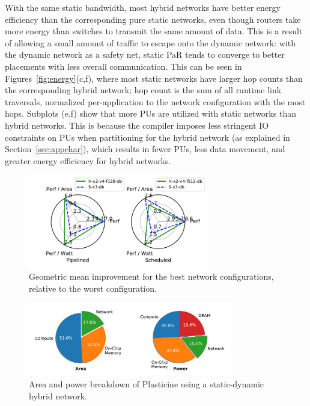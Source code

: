 With the same static bandwidth, most hybrid networks have better energy efficiency than the corresponding pure static networks, even though routers take more energy than switches to transmit the same amount of data.
This is a result of allowing a small amount of traffic to escape onto the dynamic network: with the dynamic network as a safety net, static PaR tends to converge to better placements with less overall communication.
This can be seen in Figures~\ref{fig:energy}(c,f), where most static networks have larger hop counts than the corresponding hybrid network; hop count is the sum of all runtime link traversals, normalized per-application to the network configuration with the most hops.
Subplots (e,f) show that more PUs are utilized with static networks than hybrid networks.
This is because the compiler imposes less stringent IO constraints on PUs when partitioning for the
hybrid network (as explained in Section~\ref{sec:appchar}), which results in fewer PUs, less data movement, and greater energy efficiency for hybrid networks.

\begin{figure}
  \centering
\includegraphics[width=0.7\textwidth]{network/figs/radar_best.pdf}
  \caption{Geometric mean improvement for the best network configurations, relative to the worst configuration.}\label{fig:radar_best}
\end{figure}
\begin{figure}
\centering
\includegraphics[width=0.8\textwidth]{figs/pie.pdf}
\caption[Area and power breakdown of Plasticine]{
  Area and power breakdown of Plasticine using a static-dynamic hybrid network.
}
\label{fig:breakdown}
\end{figure}

